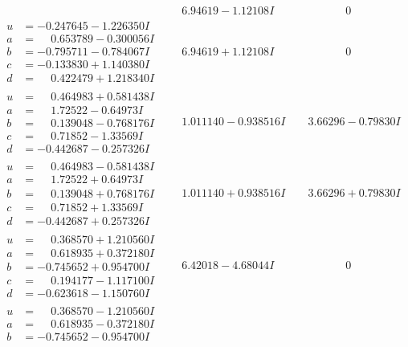 \documentclass[1p]{elsarticle_modified}
\theoremstyle{definition}
\begin{document}
$$\begin{array}{c|c|c}
 & \phantom{-}6.94619 - 1.12108 I & \phantom{-0.000000 } 0 \\ \hline\begin{aligned}
u &= -0.247645 - 1.226350 I \\
a &= \phantom{-}0.653789 - 0.300056 I \\
b &= -0.795711 - 0.784067 I \\
c &= -0.133830 + 1.140380 I \\
d &= \phantom{-}0.422479 + 1.218340 I\end{aligned}
 & \phantom{-}6.94619 + 1.12108 I & \phantom{-0.000000 } 0 \\ \hline\begin{aligned}
u &= \phantom{-}0.464983 + 0.581438 I \\
a &= \phantom{-}1.72522 - 0.64973 I \\
b &= \phantom{-}0.139048 - 0.768176 I \\
c &= \phantom{-}0.71852 - 1.33569 I \\
d &= -0.442687 - 0.257326 I\end{aligned}
 & \phantom{-}1.011140 - 0.938516 I & \phantom{-}3.66296 - 0.79830 I \\ \hline\begin{aligned}
u &= \phantom{-}0.464983 - 0.581438 I \\
a &= \phantom{-}1.72522 + 0.64973 I \\
b &= \phantom{-}0.139048 + 0.768176 I \\
c &= \phantom{-}0.71852 + 1.33569 I \\
d &= -0.442687 + 0.257326 I\end{aligned}
 & \phantom{-}1.011140 + 0.938516 I & \phantom{-}3.66296 + 0.79830 I \\ \hline\begin{aligned}
u &= \phantom{-}0.368570 + 1.210560 I \\
a &= \phantom{-}0.618935 + 0.372180 I \\
b &= -0.745652 + 0.954700 I \\
c &= \phantom{-}0.194177 - 1.117100 I \\
d &= -0.623618 - 1.150760 I\end{aligned}
 & \phantom{-}6.42018 - 4.68044 I & \phantom{-0.000000 } 0 \\ \hline\begin{aligned}
u &= \phantom{-}0.368570 - 1.210560 I \\
a &= \phantom{-}0.618935 - 0.372180 I \\
b &= -0.745652 - 0.954700 I \\

\end{aligned}
\end{array}$$
\end{document}
